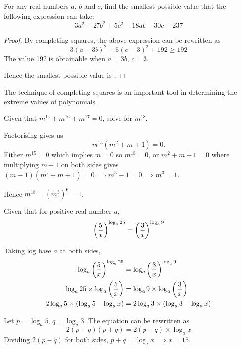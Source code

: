\begin{prbm}[SSSMO 2000]
For any real numbers $a$, $b$ and $c$, find the smallest possible value that the following expression can take:
\[ 3a^2+27b^2+5c^2-18ab-30c+237 \]
\end{prbm}

\begin{proof}
By completing squares, the above expression can be rewritten as
\[ 3(a-3b)^2+5(c-3)^2+192 \ge 192 \]
The value 192 is obtainable when $a=3b$, $c=3$. 

Hence the smallest possible value is .
\end{proof}

\begin{remark}
The technique of completing squares is an important tool in determining the extreme values of polynomials.
\end{remark}
\pagebreak

\begin{prbm}[GERMANY]
Given that $m^{15}+m^{16}+m^{17}=0$, solve for $m^{18}$.
\end{prbm}

\begin{solution}
Factorising gives us 
\[ m^{15}(m^2+m+1)=0. \]
Either $m^{15}=0$ which implies $m=0$ so $m^{18}=0$, or $m^2+m+1=0$ where multiplying $m-1$ on both sides gives $(m-1)(m^2+m+1)=0 \implies m^3-1=0 \implies m^3=1$.

Hence $m^{18}=(m^3)^6=\boxed{1}$.
\end{solution}
\pagebreak

\begin{prbm}
Given that for positive real number $a$,
\[ \left(\frac{5}{x}\right)^{\log_a 25}=\left(\frac{3}{x}\right)^{\log_a 9} \]
\end{prbm}

\begin{solution}
Taking log base $a$ at both sides,
\begin{align*}
\log_a\left(\frac{5}{x}\right)^{\log_a 25} &= \log_a\left(\frac{3}{x}\right)^{\log_a 9} \\
\log_a 25 \times \log_a\left(\frac{5}{x}\right) &= \log_a 9 \times \log_a\left(\frac{3}{x}\right) \\
2\log_a 5 \times (\log_a 5-\log_a x) &= 2\log_a 3 \times (\log_a 3 - \log_a x)
\end{align*}

Let $p=\log_a 5$, $q=\log_a 3$. The equation can be rewritten as 
\[ 2(p-q)(p+q)=2(p-q) \times \log_a x \]
Dividing $2(p-q)$ for both sides, $p+q=\log_ax\implies \boxed{x=15}$.
\end{solution}
\pagebreak


